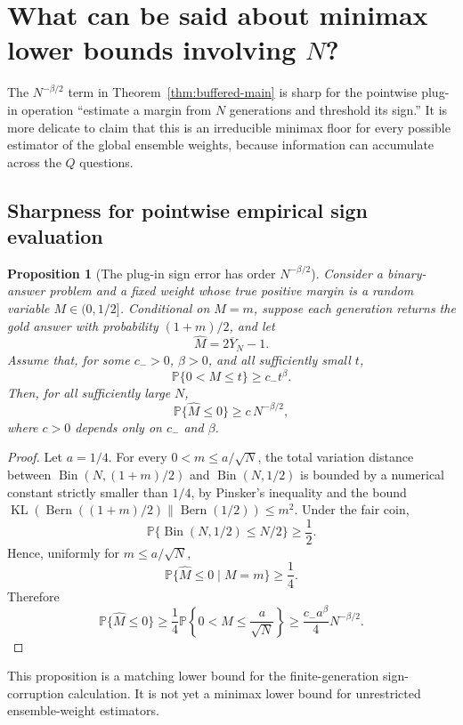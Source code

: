 \documentclass[11pt]{article}
\newtheorem{proposition}{Proposition}
\newcommand{\Pp}{\mathbb P}
\begin{document}
\section{What can be said about minimax lower bounds involving $N$?}
\label{sec:n-lower}

The $N^{-\beta/2}$ term in Theorem~\ref{thm:buffered-main} is sharp for the pointwise plug-in operation ``estimate a margin from $N$ generations and threshold its sign.''  It is more delicate to claim that this is an irreducible minimax floor for every possible estimator of the global ensemble weights, because information can accumulate across the $Q$ questions.

\subsection{Sharpness for pointwise empirical sign evaluation}

\begin{proposition}[The plug-in sign error has order $N^{-\beta/2}$]
\label{prop:plugin-lower}
Consider a binary-answer problem and a fixed weight whose true positive margin is a random variable $M\in(0,1/2]$.  Conditional on $M=m$, suppose each generation returns the gold answer with probability $(1+m)/2$, and let
\[
\widehat M=2\overline Y_N-1.
\]
Assume that, for some $c_->0$, $\beta>0$, and all sufficiently small $t$,
\[
\Pp\{0<M\le t\}
\ge
c_-t^\beta.
\]
Then, for all sufficiently large $N$,
\[
\Pp\{\widehat M\le0\}
\ge
c\,N^{-\beta/2},
\]
where $c>0$ depends only on $c_-$ and $\beta$.
\end{proposition}

\begin{proof}
Let $a=1/4$.  For every $0<m\le a/\sqrt N$, the total variation distance between $\operatorname{Bin}(N,(1+m)/2)$ and $\operatorname{Bin}(N,1/2)$ is bounded by a numerical constant strictly smaller than $1/4$, by Pinsker's inequality and the bound $\operatorname{KL}(\operatorname{Bern}((1+m)/2)\|\operatorname{Bern}(1/2))\le m^2$.  Under the fair coin,
\[
\Pp\{\operatorname{Bin}(N,1/2)\le N/2\}\ge\frac12.
\]
Hence, uniformly for $m\le a/\sqrt N$,
\[
\Pp\{\widehat M\le0\mid M=m\}\ge\frac14.
\]
Therefore
\[
\Pp\{\widehat M\le0\}
\ge
\frac14\Pp\left\{0<M\le\frac{a}{\sqrt N}\right\}
\ge
\frac{c_-a^\beta}{4}N^{-\beta/2}.
\]
\end{proof}

This proposition is a matching lower bound for the finite-generation sign-corruption calculation.  It is not yet a minimax lower bound for unrestricted ensemble-weight estimators.
\end{document}
